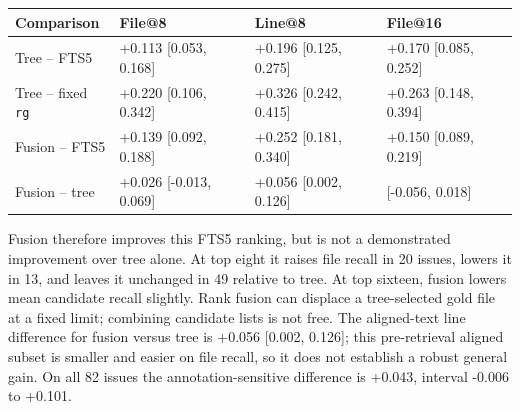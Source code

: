 \documentclass[
]{article}
\newcounter{none} %
\begin{document}
\label{tab:paired}
{\def\LTcaptype{none} %
\begin{longtable}[]{@{}
  >{\raggedright\arraybackslash}p{}
  >{\raggedleft\arraybackslash}p{}
  >{\raggedleft\arraybackslash}p{}
  >{\raggedleft\arraybackslash}p{}@{}}
\toprule\noalign{}
\begin{minipage}[b]{\linewidth}\raggedright
Comparison
\end{minipage} & \begin{minipage}[b]{\linewidth}\raggedleft
File@8
\end{minipage} & \begin{minipage}[b]{\linewidth}\raggedleft
Line@8
\end{minipage} & \begin{minipage}[b]{\linewidth}\raggedleft
File@16
\end{minipage} \\
\midrule\noalign{}
\endhead
\bottomrule\noalign{}
\endlastfoot
Tree -- FTS5 & +0.113 {[}0.053, 0.168{]} & +0.196 {[}0.125, 0.275{]} &
+0.170 {[}0.085, 0.252{]} \\
Tree -- fixed \texttt{rg} & +0.220 {[}0.106, 0.342{]} & +0.326 {[}0.242,
0.415{]} & +0.263 {[}0.148, 0.394{]} \\
Fusion -- FTS5 & +0.139 {[}0.092, 0.188{]} & +0.252 {[}0.181, 0.340{]} &
+0.150 {[}0.089, 0.219{]} \\
Fusion -- tree & +0.026 {[}-0.013, 0.069{]} & +0.056 {[}0.002, 0.126{]}
& -0.020 {[}-0.056, 0.018{]} \\
\end{longtable}
}

Fusion therefore improves this FTS5 ranking, but is not a demonstrated
improvement over tree alone. At top eight it raises file recall in 20
issues, lowers it in 13, and leaves it unchanged in 49 relative to tree.
At top sixteen, fusion lowers mean candidate recall slightly. Rank
fusion can displace a tree-selected gold file at a fixed limit;
combining candidate lists is not free. The aligned-text line difference
for fusion versus tree is +0.056 {[}0.002, 0.126{]}; this pre-retrieval
aligned subset is smaller and easier on file recall, so it does not establish a
robust general gain. On all 82 issues the annotation-sensitive
difference is +0.043, interval -0.006 to +0.101.
\end{document}
